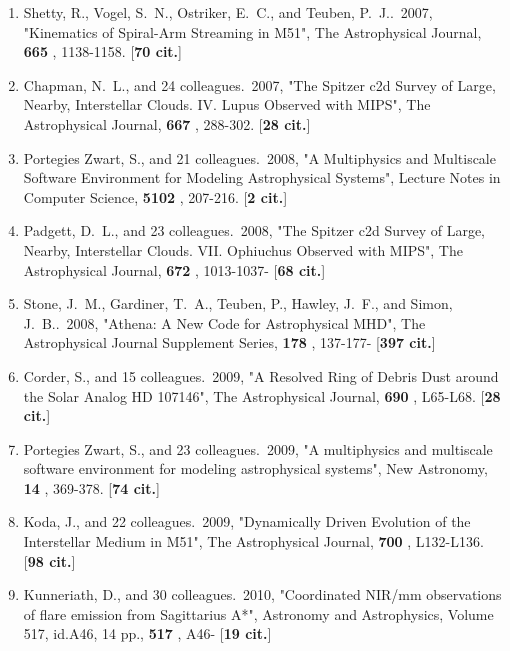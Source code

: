 \documentclass[11pt,letterpaper]{article}
\begin{document}
\begin{enumerate}[resume,label=\textbf{\arabic*}.]
\item  
Shetty, R., Vogel, S.~N., Ostriker, E.~C., and Teuben, P.~J..\  2007,  
"Kinematics of Spiral-Arm Streaming in M51", The Astrophysical Journal,  
{\bf 665} , 1138-1158.  [{\bf 70 cit.}] 

\item  
Chapman, N.~L., and 24 colleagues.\  2007,  "The Spitzer c2d Survey of 
Large, Nearby, Interstellar Clouds. IV. Lupus Observed with MIPS", The 
Astrophysical Journal,  {\bf 667} , 288-302.  [{\bf 28 cit.}] 

\item  
Portegies Zwart, S., and 21 colleagues.\  2008,  "A Multiphysics and 
Multiscale Software Environment for Modeling Astrophysical Systems", 
Lecture Notes in Computer Science,  {\bf 5102} , 207-216.  [{\bf 2 cit.}] 

\item  
Padgett, D.~L., and 23 colleagues.\  2008,  "The Spitzer c2d Survey of 
Large, Nearby, Interstellar Clouds. VII. Ophiuchus Observed with MIPS", The 
Astrophysical Journal,  {\bf 672} , 1013-1037- [{\bf 68 cit.}] 

\item  
Stone, J.~M., Gardiner, T.~A., Teuben, P., Hawley, J.~F., and Simon, 
J.~B..\  2008,  "Athena: A New Code for Astrophysical MHD", The 
Astrophysical Journal Supplement Series,  {\bf 178} , 137-177- [{\bf 397 
cit.}] 

\item  
Corder, S., and 15 colleagues.\  2009,  "A Resolved Ring of Debris Dust 
around the Solar Analog HD 107146", The Astrophysical Journal,  {\bf 690} , 
L65-L68.  [{\bf 28 cit.}] 

\item  
Portegies Zwart, S., and 23 colleagues.\  2009,  "A multiphysics and 
multiscale software environment for modeling astrophysical systems", New 
Astronomy,  {\bf 14} , 369-378.  [{\bf 74 cit.}] 

\item  
Koda, J., and 22 colleagues.\  2009,  "Dynamically Driven Evolution of the 
Interstellar Medium in M51", The Astrophysical Journal,  {\bf 700} , 
L132-L136.  [{\bf 98 cit.}] 

\item  
Kunneriath, D., and 30 colleagues.\  2010,  "Coordinated NIR/mm 
observations of flare emission from Sagittarius A*", Astronomy and 
Astrophysics, Volume 517, id.A46, 14 pp.,  {\bf 517} , A46- [{\bf 19 cit.}] 


\end{enumerate}
\end{document}
